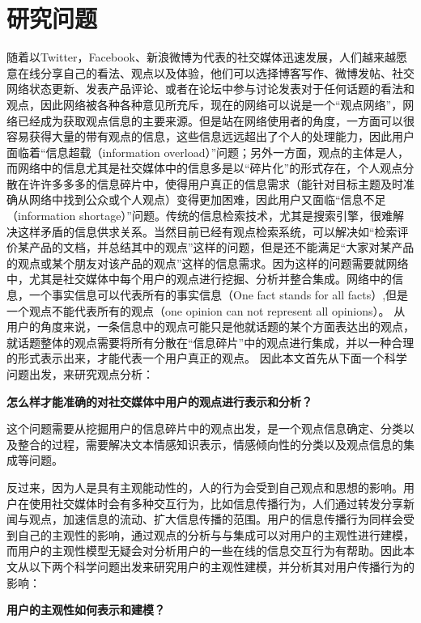 \section{研究问题}
\label{point}
随着以Twitter，Facebook、新浪微博为代表的社交媒体迅速发展，人们越来越愿意在线分享自己的看法、观点以及体验，他们可以选择博客写作、微博发帖、社交网络状态更新、发表产品评论、或者在论坛中参与讨论发表对于任何话题的看法和观点，因此网络被各种各种意见所充斥，现在的网络可以说是一个“观点网络”，网络已经成为获取观点信息的主要来源。但是站在网络使用者的角度，一方面可以很容易获得大量的带有观点的信息，这些信息远远超出了个人的处理能力，因此用户面临着“信息超载（information overload）”问题；另外一方面，观点的主体是人，而网络中的信息尤其是社交媒体中的信息多是以“碎片化”的形式存在，个人观点分散在许许多多多的信息碎片中，使得用户真正的信息需求（能针对目标主题及时准确从网络中找到公众或个人观点）变得更加困难，因此用户又面临“信息不足（information shortage）”问题。传统的信息检索技术，尤其是搜索引擎，很难解决这样矛盾的信息供求关系。当然目前已经有观点检索系统，可以解决如“检索评价某产品的文档，并总结其中的观点”这样的问题，但是还不能满足“大家对某产品的观点或某个朋友对该产品的观点”这样的信息需求。因为这样的问题需要就网络中，尤其是社交媒体中每个用户的观点进行挖掘、分析并整合集成。网络中的信息，一个事实信息可以代表所有的事实信息（One fact stands for all facts）,但是一个观点不能代表所有的观点（one opinion can not represent all opinions）。
从用户的角度来说，一条信息中的观点可能只是他就话题的某个方面表达出的观点，就话题整体的观点需要将所有分散在“信息碎片”中的观点进行集成，并以一种合理的形式表示出来，才能代表一个用户真正的观点。
因此本文首先从下面一个科学问题出发，来研究观点分析：

\textbf{怎么样才能准确的对社交媒体中用户的观点进行表示和分析？}

这个问题需要从挖掘用户的信息碎片中的观点出发，是一个观点信息确定、分类以及整合的过程，需要解决文本情感知识表示，情感倾向性的分类以及观点信息的集成等问题。

反过来，因为人是具有主观能动性的，人的行为会受到自己观点和思想的影响。用户在使用社交媒体时会有多种交互行为，比如信息传播行为，人们通过转发分享新闻与观点，加速信息的流动、扩大信息传播的范围。用户的信息传播行为同样会受到自己的主观性的影响，通过观点的分析与与集成可以对用户的主观性进行建模，而用户的主观性模型无疑会对分析用户的一些在线的信息交互行为有帮助。因此本文从以下两个科学问题出发来研究用户的主观性建模，并分析其对用户传播行为的影响：

\textbf{用户的主观性如何表示和建模？}

